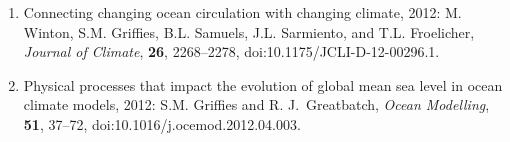\begin{enumerate}[leftmargin=*]
\item Connecting changing ocean circulation with changing climate, 2012: M. Winton, S.M. Grif\/f\/ies, B.L. Samuels, J.L. Sarmiento, and T.L. Froelicher, {\it Journal of Climate}, {\bf 26}, 2268--2278, doi:10.1175/JCLI-D-12-00296.1.

\item Physical processes that impact the evolution of global mean sea  level in ocean climate models, 2012: S.M. Grif\/f\/ies and R. J.\  Greatbatch, {\it Ocean Modelling}, {\bf 51}, 37--72,  doi:10.1016/j.ocemod.2012.04.003.


\end{enumerate}
